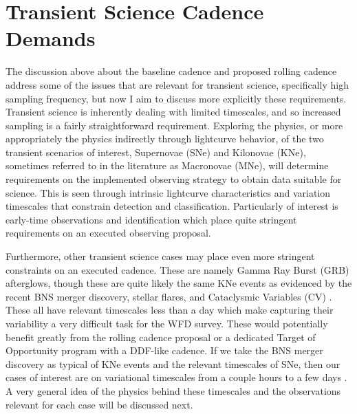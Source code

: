 \documentclass[12pt]{article}
\begin{document}
\section{Transient Science Cadence Demands} %
The discussion above about the baseline cadence and proposed rolling cadence address some of the issues that are relevant for transient science, specifically high sampling frequency, but now I aim to discuss more explicitly these requirements. Transient science is inherently dealing with limited timescales, and so increased sampling is a fairly straightforward requirement. Exploring the physics, or more appropriately the physics indirectly through lightcurve behavior, of the two transient scenarios of interest, Supernovae (SNe) and Kilonovae (KNe), sometimes referred to in the literature as Macronovae (MNe), will determine requirements on the implemented observing strategy to obtain data suitable for science. This is seen through intrinsic lightcurve characteristics and variation timescales that constrain detection and classification. Particularly of interest is early-time observations and identification which place quite stringent requirements on an executed observing proposal. \par
Furthermore, other transient science cases may place even more stringent constraints on an executed cadence. These are namely Gamma Ray Burst (GRB) afterglows, though these are quite likely the same KNe events as evidenced by the recent BNS merger discovery, stellar flares, and Cataclysmic Variables (CV) \citep{Villar2017}. These all have relevant timescales less than a day which make capturing their variability a very difficult task for the WFD survey. These would potentially benefit greatly from the rolling cadence proposal or a dedicated Target of Opportunity program with a DDF-like cadence. If we take the BNS merger discovery as typical of KNe events and the relevant timescales of SNe, then our cases of interest are on variational timescales from a couple hours to a few days \citep{LSSTScienceCollaboration2017}. A very general idea of the physics behind these timescales and the observations relevant for each case will be discussed next.\par
\end{document}
